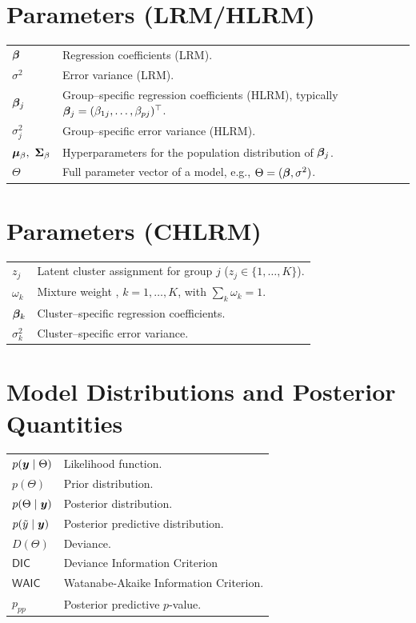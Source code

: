 \section*{Parameters (LRM/HLRM)}
\begin{tabularx}{\textwidth}{>{\raggedright\arraybackslash}p{2.6cm} X}
$\bm{\beta}$ & Regression coefficients (LRM). \\
$\sigma^2$ & Error variance (LRM). \\
$\bm{\beta}_j$ & Group--specific regression coefficients (HLRM), typically $\bm{\beta}_j=(\beta_{1j},\ldots,\beta_{pj})^\top$. \\
$\sigma_j^2$ & Group--specific error variance (HLRM). \\
$\bm{\mu}_\beta,\ \mathbf{\Sigma}_\beta$ & Hyperparameters for the population distribution of $\bm{\beta}_j$. \\
$\Theta$ & Full parameter vector of a model, e.g., $\Theta=(\bm{\beta},\sigma^2)$.\\
\end{tabularx}

\vspace{0.5em}
\section*{Parameters (CHLRM)}
\begin{tabularx}{\textwidth}{>{\raggedright\arraybackslash}p{2.6cm} X}
$z_j$ & Latent cluster assignment for group $j$ ($z_j\in\{1,\ldots,K\}$). \\
$\omega_k$ & Mixture weight , $k=1,\ldots,K$, with $\sum_k \omega_k=1$. \\
$\bm{\beta}_k$ & Cluster--specific regression coefficients. \\
$\sigma_k^2$ & Cluster--specific error variance. \\
\end{tabularx}

\vspace{0.5em}
\section*{Model Distributions and Posterior Quantities}
\begin{tabularx}{\textwidth}{>{\raggedright\arraybackslash}p{2.6cm} X}
$p(\bm{y}\mid\Theta)$ & Likelihood function. \\
$p(\Theta)$ & Prior distribution. \\
$p(\Theta\mid\bm{y})$ & Posterior distribution. \\
$p(\tilde{y}\mid \bm{y})$ & Posterior predictive distribution. \\
$D(\Theta)$ & Deviance. \\
$\mathsf{DIC}$ & Deviance Information Criterion\\
$\mathsf{WAIC}$ & Watanabe-Akaike Information Criterion. \\
$p_{pp}$ & Posterior predictive $p$-value. \\
\end{tabularx}

